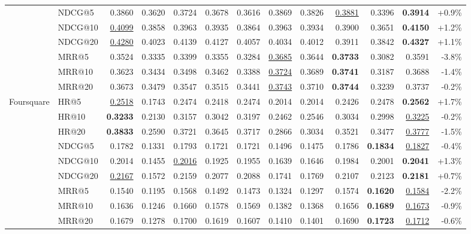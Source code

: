 \documentclass[sigconf,review,anonymous]{acmart}
\newcommand{\tblbest}[1]{\textbf{#1}}
\newcommand{\tblsecond}[1]{\underline{#1}}
\begin{document}
\begin{table}[t]
{\begin{tabular}{llrrrrrrrrrrr}
      & NDCG@5  & 0.3860 & 0.3620 & 0.3724 & 0.3678 & 0.3616 & 0.3869 & 0.3826 & \tblsecond{0.3881} & 0.3396 & \tblbest{0.3914} & +0.9\% \\
      & NDCG@10 & \tblsecond{0.4099} & 0.3858 & 0.3963 & 0.3935 & 0.3864 & 0.3963 & 0.3934 & 0.3900 & 0.3651 & \tblbest{0.4150} & +1.2\% \\
      & NDCG@20 & \tblsecond{0.4280} & 0.4023 & 0.4139 & 0.4127 & 0.4057 & 0.4034 & 0.4012 & 0.3911 & 0.3842 & \tblbest{0.4327} & +1.1\% \\
      & MRR@5   & 0.3524 & 0.3335 & 0.3399 & 0.3355 & 0.3284 & \tblsecond{0.3685} & 0.3644 & \tblbest{0.3733} & 0.3082 & 0.3591 & -3.8\% \\
      & MRR@10  & 0.3623 & 0.3434 & 0.3498 & 0.3462 & 0.3388 & \tblsecond{0.3724} & 0.3689 & \tblbest{0.3741} & 0.3187 & 0.3688 & -1.4\% \\
      & MRR@20  & 0.3673 & 0.3479 & 0.3547 & 0.3515 & 0.3441 & \tblsecond{0.3743} & 0.3710 & \tblbest{0.3744} & 0.3239 & 0.3737 & -0.2\% \\
    \midrule
    \multirow{9}{*}{Foursquare}
      & HR@5    & \tblsecond{0.2518} & 0.1743 & 0.2474 & 0.2418 & 0.2474 & 0.2014 & 0.2014 & 0.2426 & 0.2478 & \tblbest{0.2562} & +1.7\% \\
      & HR@10   & \tblbest{0.3233} & 0.2130 & 0.3157 & 0.3042 & 0.3197 & 0.2462 & 0.2546 & 0.3034 & 0.2998 & \tblsecond{0.3225} & -0.2\% \\
      & HR@20   & \tblbest{0.3833} & 0.2590 & 0.3721 & 0.3645 & 0.3717 & 0.2866 & 0.3034 & 0.3521 & 0.3477 & \tblsecond{0.3777} & -1.5\% \\
      & NDCG@5  & 0.1782 & 0.1331 & 0.1793 & 0.1721 & 0.1721 & 0.1496 & 0.1475 & 0.1786 & \tblbest{0.1834} & \tblsecond{0.1827} & -0.4\% \\
      & NDCG@10 & 0.2014 & 0.1455 & \tblsecond{0.2016} & 0.1925 & 0.1955 & 0.1639 & 0.1646 & 0.1984 & 0.2001 & \tblbest{0.2041} & +1.3\% \\
      & NDCG@20 & \tblsecond{0.2167} & 0.1572 & 0.2159 & 0.2077 & 0.2088 & 0.1741 & 0.1769 & 0.2107 & 0.2123 & \tblbest{0.2181} & +0.7\% \\
      & MRR@5   & 0.1540 & 0.1195 & 0.1568 & 0.1492 & 0.1473 & 0.1324 & 0.1297 & 0.1574 & \tblbest{0.1620} & \tblsecond{0.1584} & -2.2\% \\
      & MRR@10  & 0.1636 & 0.1246 & 0.1660 & 0.1578 & 0.1569 & 0.1382 & 0.1368 & 0.1656 & \tblbest{0.1689} & \tblsecond{0.1673} & -0.9\% \\
      & MRR@20  & 0.1679 & 0.1278 & 0.1700 & 0.1619 & 0.1607 & 0.1410 & 0.1401 & 0.1690 & \tblbest{0.1723} & \tblsecond{0.1712} & -0.6\% \\

\end{tabular}}
\end{table}
\end{document}
